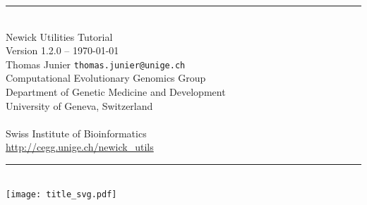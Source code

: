 \documentclass[a4paper,10pt]{report}
\newcommand{\Hrule}[1]{\rule{\linewidth}{#1}}
\begin{document}
\begin{titlepage}
\begin{center}
\Hrule{0.5mm} \\[0.8cm]
{\Huge Newick Utilities Tutorial} \\[0.5cm]
Version 1.2.0 -- \today \\
\medskip
Thomas Junier \texttt{thomas.junier@unige.ch} \\
Computational Evolutionary Genomics Group \\
Department of Genetic Medicine and Development \\
University of Geneva, Switzerland \\
   \\
Swiss Institute of Bioinformatics \\
\medskip
\url{http://cegg.unige.ch/newick_utils}
\Hrule{0.5mm}
\\[2cm]
\texttt{[image: title\_svg.pdf]}
\end{center}
\end{titlepage}

\tableofcontents











\appendix










% 

% 
\end{document}

